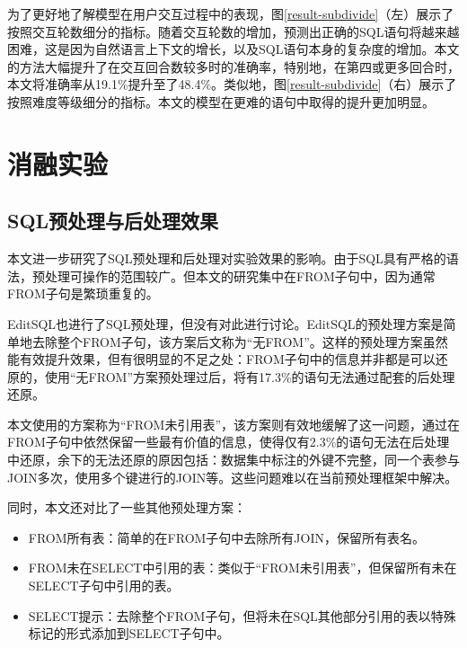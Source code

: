为了更好地了解模型在用户交互过程中的表现，图\ref{result-subdivide}（左）展示了按照交互轮数细分的指标。随着交互轮数的增加，预测出正确的SQL语句将越来越困难，这是因为自然语言上下文的增长，以及SQL语句本身的复杂度的增加。本文的方法大幅提升了在交互回合数较多时的准确率，特别地，在第四或更多回合时，本文将准确率从19.1\%提升至了48.4\%。类似地，图\ref{result-subdivide}（右）展示了按照难度等级细分的指标。本文的模型在更难的语句中取得的提升更加明显。

\section{消融实验}

\subsection{SQL预处理与后处理效果}

本文进一步研究了SQL预处理和后处理对实验效果的影响。由于SQL具有严格的语法，预处理可操作的范围较广。但本文的研究集中在FROM子句中，因为通常FROM子句是繁琐重复的。

EditSQL也进行了SQL预处理，但没有对此进行讨论。EditSQL的预处理方案是简单地去除整个FROM子句，该方案后文称为“无FROM”。这样的预处理方案虽然能有效提升效果，但有很明显的不足之处：FROM子句中的信息并非都是可以还原的，使用“无FROM”方案预处理过后，将有17.3\%的语句无法通过配套的后处理还原。

本文使用的方案称为“FROM未引用表”，该方案则有效地缓解了这一问题，通过在FROM子句中依然保留一些最有价值的信息，使得仅有2.3\%的语句无法在后处理中还原，余下的无法还原的原因包括：数据集中标注的外键不完整，同一个表参与JOIN多次，使用多个键进行的JOIN等。这些问题难以在当前预处理框架中解决。

同时，本文还对比了一些其他预处理方案：
\begin{itemize}
    \item FROM所有表：简单的在FROM子句中去除所有JOIN，保留所有表名。
    \item FROM未在SELECT中引用的表：类似于“FROM未引用表”，但保留所有未在SELECT子句中引用的表。
    \item SELECT提示：去除整个FROM子句，但将未在SQL其他部分引用的表以特殊标记的形式添加到SELECT子句中。
\end{itemize}

